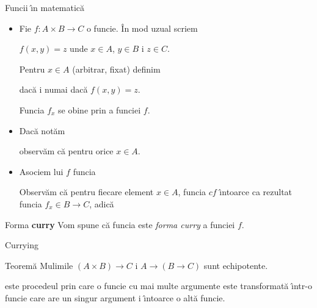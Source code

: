 \documentclass[xcolor=pdftex,romanian,colorlinks]{beamer}
\begin{document}
\begin{frame}{Func\ts ii \^{\i}n matematic\u a}

  \begin{itemize}
  
  \item Fie $f:A\times B\to C$ o func\ts ie. \^{I}n mod uzual scriem
  
  $f(x,y)=z$  unde $x\in A$, $y\in B$ \sh i $z\in C$.
  
  \vitem Pentru $x\in A$ (arbitrar, fixat) definim
  
   dac\u a \sh i numai dac\u a $f(x,y)=z$.
  
  Func\ts ia $f_x$ se ob\ts ine prin  a func\ts iei $f$.

  \item<3-> Dac\u a not\u am 
  
  observ\u am c\u a  pentru orice $x\in A$.
  
  \item<4-> Asociem lui $f$ func\ts ia
  
  
  
  Observ\u am c\u a pentru fiecare element $x\in A$, func\ts ia $cf$ \^{\i}ntoarce ca rezultat func\ts ia $f_x\in B\to C$,
  adic\u a
  
  
  \end{itemize}
  
  \begin{block}{Forma {\bf curry}}
  Vom spune c\u a func\ts ia  este {\it forma curry} a func\ts iei $f$.
  \end{block}
  
  \end{frame}
  
\begin{frame}{Currying}
  \begin{block}{Teorem\u a}
  Mul\ts imile $(A\times B)\to C$ \sh i $A\to (B\to C)$ sunt echipotente.
  \end{block}

  \begin{block}{}
   este procedeul prin care o func\ts ie cu mai multe argumente este transformat\u a \^{\i}ntr-o func\ts ie care are un singur argument \sh i \^{\i}ntoarce o alt\u a func\ts ie.
  \end{block}
  \bigskip
  
\end{frame}
  
\end{document}
